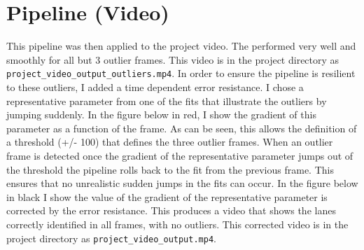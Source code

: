 \documentclass[letterpaper,12pt]{article}
\begin{document}
\section{Pipeline (Video)}
This pipeline was then applied to the project video. The performed very well and smoothly for all but 3 outlier frames. This video is in the project directory as \texttt{project\_video\_output\_outliers.mp4}. In order to ensure the pipeline is resilient to these outliers, I added a time dependent error resistance. I chose a representative parameter from one of the fits that illustrate the outliers by jumping suddenly. In the figure below in red, I show the gradient of this parameter as a function of the frame. As can be seen, this allows the definition of a threshold (+/- 100) that defines the three outlier frames. When an outlier frame is detected once the gradient of the representative parameter jumps out of the threshold the pipeline rolls back to the fit from the previous frame. This ensures that no unrealistic sudden jumps in the fits can occur. In the figure below in black I show the value of the gradient of the representative parameter is corrected by the error resistance. This produces a video that shows the lanes correctly identified in all frames, with no outliers. This corrected video is in the project directory as \texttt{project\_video\_output.mp4}. 
\FloatBarrier
\begin{figure}
\centering
{}
\end{figure}
\FloatBarrier
\end{document}
